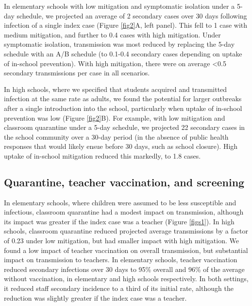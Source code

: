 \documentclass[
]{article}
\begin{document}
In elementary schools with low mitigation and symptomatic isolation
under a 5-day schedule, we projected an average of 2 secondary cases
over 30 days following infection of a single index case (Figure
\ref{fig2}A, left panel). This fell to 1 case with medium mitigation,
and further to 0.4 cases with high mitigation. Under symptomatic
isolation, transmission was most reduced by replacing the 5-day schedule
with an A/B schedule (to 0.1-0.4 secondary cases depending on uptake of
in-school prevention). With high mitigation, there were on average
\textless0.5 secondary transmissions per case in all scenarios.

In high schools, where we specified that students acquired and
transmitted infection at the same rate as adults, we found the potential
for larger outbreaks after a single introduction into the school,
particularly when uptake of in-school prevention was low (Figure
\ref{fig2}B). For example, with low mitigation and classroom quarantine
under a 5-day schedule, we projected 22 secondary cases in the school
community over a 30-day period (in the absence of public health
responses that would likely ensue before 30 days, such as school
closure). High uptake of in-school mitigation reduced this markedly, to
1.8 cases.

\hypertarget{quarantine-teacher-vaccination-and-screening}{%
\subsection{Quarantine, teacher vaccination, and
screening}\label{quarantine-teacher-vaccination-and-screening}}

In elementary schools, where children were assumed to be less
susceptible and infectious, classroom quarantine had a modest impact on
transmission, although its impact was greater if the index case was a
teacher (Figure \ref{figs1}). In high schools, classroom quarantine
reduced projected average transmissions by a factor of 0.23 under low
mitigation, but had smaller impact with high mitigation. We found a low
impact of teacher vaccination on overall transmission, but substantial
impact on transmission to teachers. In elementary schools, teacher
vaccination reduced secondary infections over 30 days to 95\% overall
and 96\% of the average without vaccination, in elementary and high
schools respectively. In both settings, it reduced staff secondary
incidence to a third of its initial rate, although the reduction was
slightly greater if the index case was a teacher.
\end{document}
